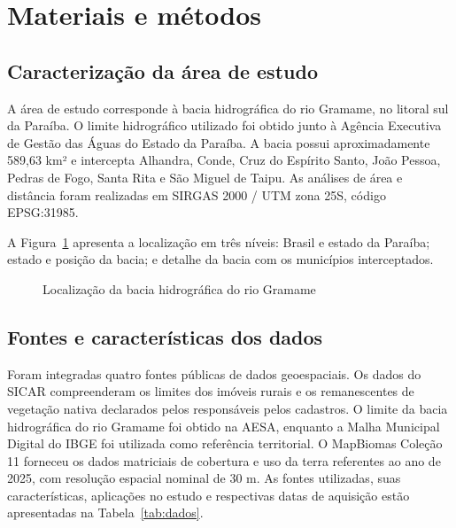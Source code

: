 
\section{Materiais e métodos}

\subsection{Caracterização da área de estudo}

A área de estudo corresponde à bacia hidrográfica do rio Gramame, no litoral sul da Paraíba. O limite hidrográfico utilizado foi obtido junto à Agência Executiva de Gestão das Águas do Estado da Paraíba. A bacia possui aproximadamente 589,63 km² e intercepta Alhandra, Conde, Cruz do Espírito Santo, João Pessoa, Pedras de Fogo, Santa Rita e São Miguel de Taipu. As análises de área e distância foram realizadas em SIRGAS 2000 / UTM zona 25S, código EPSG:31985.

A Figura~\ref{fig:localizacao} apresenta a localização em três níveis: Brasil e estado da Paraíba; estado e posição da bacia; e detalhe da bacia com os municípios interceptados.

\begin{figure}[H]
\centering
\caption{Localização da bacia hidrográfica do rio Gramame}
\label{fig:localizacao}
\end{figure}

\subsection{Fontes e características dos dados}

Foram integradas quatro fontes públicas de dados geoespaciais. Os dados do SICAR compreenderam os limites dos imóveis rurais e os remanescentes de vegetação nativa declarados pelos responsáveis pelos cadastros. O limite da bacia hidrográfica do rio Gramame foi obtido na AESA, enquanto a Malha Municipal Digital do IBGE foi utilizada como referência territorial. O MapBiomas Coleção 11 forneceu os dados matriciais de cobertura e uso da terra referentes ao ano de 2025, com resolução espacial nominal de 30 m. As fontes utilizadas, suas características, aplicações no estudo e respectivas datas de aquisição estão apresentadas na Tabela~\ref{tab:dados}.


